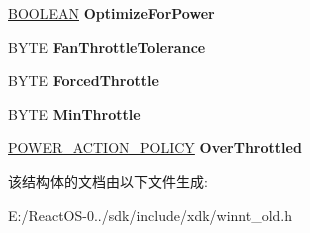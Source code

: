 \begin{DoxyCompactItemize}
\mbox{\label{struct___s_y_s_t_e_m___p_o_w_e_r___p_o_l_i_c_y_abd764666694eb267ec330a3d4176c176}} 
\hyperlink{_processor_bind_8h_a112e3146cb38b6ee95e64d85842e380a}{B\+O\+O\+L\+E\+AN} {\bfseries Optimize\+For\+Power}
\item 
\mbox{\label{struct___s_y_s_t_e_m___p_o_w_e_r___p_o_l_i_c_y_a14d2fd99575abd85ce6ea92f4f5dba8c}} 
B\+Y\+TE {\bfseries Fan\+Throttle\+Tolerance}
\item 
\mbox{\label{struct___s_y_s_t_e_m___p_o_w_e_r___p_o_l_i_c_y_a837c7604ba562a317cedb7ecb53c4905}} 
B\+Y\+TE {\bfseries Forced\+Throttle}
\item 
\mbox{\label{struct___s_y_s_t_e_m___p_o_w_e_r___p_o_l_i_c_y_ad70f409253501027f013f8ac919c22a4}} 
B\+Y\+TE {\bfseries Min\+Throttle}
\item 
\mbox{\label{struct___s_y_s_t_e_m___p_o_w_e_r___p_o_l_i_c_y_aa77f2c61ff59a9b59b13da4be965d836}} 
\hyperlink{struct___p_o_w_e_r___a_c_t_i_o_n___p_o_l_i_c_y}{P\+O\+W\+E\+R\+\_\+\+A\+C\+T\+I\+O\+N\+\_\+\+P\+O\+L\+I\+CY} {\bfseries Over\+Throttled}
\end{DoxyCompactItemize}


该结构体的文档由以下文件生成\+:\begin{DoxyCompactItemize}
\item 
E\+:/\+React\+O\+S-\/0../sdk/include/xdk/winnt\+\_\+old.\+h\end{DoxyCompactItemize}
